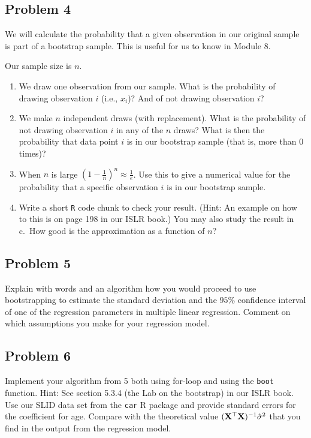 \documentclass[
]{article}
\providecommand{\tightlist}{%
  \setlength{\itemsep}{0pt}\setlength{\parskip}{0pt}}
\begin{document}
\subsection{Problem 4}\label{problem-4}

We will calculate the probability that a given observation in our
original sample is part of a bootstrap sample. This is useful for us to
know in Module 8.

Our sample size is \(n\).

\begin{enumerate}
\def\labelenumi{\alph{enumi}.}
\tightlist
\item
  We draw one observation from our sample. What is the probability of
  drawing observation \(i\) (i.e., \(x_i\))? And of not drawing
  observation \(i\)?
\item
  We make \(n\) independent draws (with replacement). What is the
  probability of not drawing observation \(i\) in any of the \(n\)
  draws? What is then the probability that data point \(i\) is in our
  bootstrap sample (that is, more than \(0\) times)?
\item
  When \(n\) is large \((1-\frac{1}{n})^n \approx \frac{1}{e}\). Use
  this to give a numerical value for the probability that a specific
  observation \(i\) is in our bootstrap sample.
\item
  Write a short \texttt{R} code chunk to check your result. (Hint: An
  example on how to this is on page 198 in our ISLR book.) You may also
  study the result in c.~How good is the approximation as a function of
  \(n\)?
\end{enumerate}

\subsection{Problem 5}\label{problem-5}

Explain with words and an algorithm how you would proceed to use
bootstrapping to estimate the standard deviation and the \(95\%\)
confidence interval of one of the regression parameters in multiple
linear regression. Comment on which assumptions you make for your
regression model.

\subsection{Problem 6}\label{problem-6}

Implement your algorithm from 5 both using for-loop and using the
\texttt{boot} function. Hint: See section 5.3.4 (the Lab on the
bootstrap) in our ISLR book. Use our SLID data set from the \texttt{car}
R package and provide standard errors for the coefficient for age.
Compare with the theoretical value
\(({\bf X}^\top{\bf X})^{-1}\hat{\sigma}^2\) that you find in the output
from the regression model.
\end{document}
